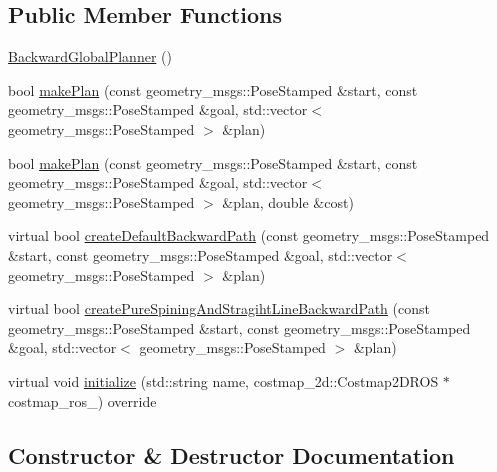 \subsection*{Public Member Functions}
\begin{DoxyCompactItemize}
\item 
\hyperlink{classbackward__global__planner_1_1BackwardGlobalPlanner_a48d3b3dce0048508b0cbaf399102803f}{Backward\+Global\+Planner} ()
\item 
bool \hyperlink{classbackward__global__planner_1_1BackwardGlobalPlanner_a39f2e0d5090f0776942d7cd68eecbde1}{make\+Plan} (const geometry\+\_\+msgs\+::\+Pose\+Stamped \&start, const geometry\+\_\+msgs\+::\+Pose\+Stamped \&goal, std\+::vector$<$ geometry\+\_\+msgs\+::\+Pose\+Stamped $>$ \&plan)
\item 
bool \hyperlink{classbackward__global__planner_1_1BackwardGlobalPlanner_ade177af3c2a0660781f71e3c2ba0b343}{make\+Plan} (const geometry\+\_\+msgs\+::\+Pose\+Stamped \&start, const geometry\+\_\+msgs\+::\+Pose\+Stamped \&goal, std\+::vector$<$ geometry\+\_\+msgs\+::\+Pose\+Stamped $>$ \&plan, double \&cost)
\item 
virtual bool \hyperlink{classbackward__global__planner_1_1BackwardGlobalPlanner_a625dba5902c088241ab25c9fb628fd04}{create\+Default\+Backward\+Path} (const geometry\+\_\+msgs\+::\+Pose\+Stamped \&start, const geometry\+\_\+msgs\+::\+Pose\+Stamped \&goal, std\+::vector$<$ geometry\+\_\+msgs\+::\+Pose\+Stamped $>$ \&plan)
\item 
virtual bool \hyperlink{classbackward__global__planner_1_1BackwardGlobalPlanner_ad0caebe12fdd6cfe66d353bc7b772718}{create\+Pure\+Spining\+And\+Stragiht\+Line\+Backward\+Path} (const geometry\+\_\+msgs\+::\+Pose\+Stamped \&start, const geometry\+\_\+msgs\+::\+Pose\+Stamped \&goal, std\+::vector$<$ geometry\+\_\+msgs\+::\+Pose\+Stamped $>$ \&plan)
\item 
virtual void \hyperlink{classbackward__global__planner_1_1BackwardGlobalPlanner_ac0dfce1f9ba6d39a3b37ea6c99fac2ae}{initialize} (std\+::string name, costmap\+\_\+2d\+::\+Costmap2\+D\+R\+OS $\ast$costmap\+\_\+ros\+\_\+) override
\end{DoxyCompactItemize}


\subsection{Constructor \& Destructor Documentation}
